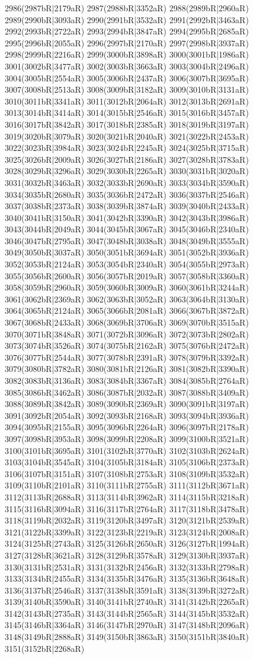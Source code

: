 2986(2987bR|2179aR) 2987(2988bR|3352aR) 2988(2989bR|2960aR) 2989(2990bR|3093aR) 2990(2991bR|3532aR) 2991(2992bR|3463aR) 2992(2993bR|2722aR) 2993(2994bR|3847aR) 2994(2995bR|2685aR) 2995(2996bR|2055aR) 2996(2997bR|2170aR) 2997(2998bR|3937aR) 2998(2999bR|2216aR) 2999(3000bR|3898aR) 3000(3001bR|1986aR) 3001(3002bR|3477aR) 3002(3003bR|3663aR) 3003(3004bR|2496aR) 3004(3005bR|2554aR) 3005(3006bR|2437aR) 3006(3007bR|3695aR) 3007(3008bR|2513aR) 3008(3009bR|3182aR) 3009(3010bR|3131aR) 3010(3011bR|3341aR) 3011(3012bR|2064aR) 3012(3013bR|2691aR) 3013(3014bR|3414aR) 3014(3015bR|2546aR) 3015(3016bR|3457aR) 3016(3017bR|3842aR) 3017(3018bR|2385aR) 3018(3019bR|3197aR) 3019(3020bR|3079aR) 3020(3021bR|2040aR) 3021(3022bR|2453aR) 3022(3023bR|3984aR) 3023(3024bR|2245aR) 3024(3025bR|3715aR) 3025(3026bR|2009aR) 3026(3027bR|2186aR) 3027(3028bR|3783aR) 3028(3029bR|3296aR) 3029(3030bR|2265aR) 3030(3031bR|3020aR) 3031(3032bR|3463aR) 3032(3033bR|2690aR) 3033(3034bR|3590aR) 3034(3035bR|2680aR) 3035(3036bR|2472aR) 3036(3037bR|2546aR) 3037(3038bR|2373aR) 3038(3039bR|3874aR) 3039(3040bR|2433aR) 3040(3041bR|3150aR) 3041(3042bR|3390aR) 3042(3043bR|3986aR) 3043(3044bR|2049aR) 3044(3045bR|3067aR) 3045(3046bR|2340aR) 3046(3047bR|2795aR) 3047(3048bR|3038aR) 3048(3049bR|3555aR) 3049(3050bR|3037aR) 3050(3051bR|3694aR) 3051(3052bR|3936aR) 3052(3053bR|2124aR) 3053(3054bR|2340aR) 3054(3055bR|2973aR) 3055(3056bR|2600aR) 3056(3057bR|2019aR) 3057(3058bR|3360aR) 3058(3059bR|2960aR) 3059(3060bR|3009aR) 3060(3061bR|3244aR) 3061(3062bR|2369aR) 3062(3063bR|3052aR) 3063(3064bR|3130aR) 3064(3065bR|2124aR) 3065(3066bR|2081aR) 3066(3067bR|3872aR) 3067(3068bR|2433aR) 3068(3069bR|3706aR) 3069(3070bR|3515aR) 3070(3071bR|3848aR) 3071(3072bR|3096aR) 3072(3073bR|2802aR) 3073(3074bR|3526aR) 3074(3075bR|2162aR) 3075(3076bR|2472aR) 3076(3077bR|2544aR) 3077(3078bR|2391aR) 3078(3079bR|3392aR) 3079(3080bR|3782aR) 3080(3081bR|2126aR) 3081(3082bR|3390aR) 3082(3083bR|3136aR) 3083(3084bR|3367aR) 3084(3085bR|2764aR) 3085(3086bR|3462aR) 3086(3087bR|2032aR) 3087(3088bR|3409aR) 3088(3089bR|3842aR) 3089(3090bR|2369aR) 3090(3091bR|3197aR) 3091(3092bR|2054aR) 3092(3093bR|2168aR) 3093(3094bR|3936aR) 3094(3095bR|2155aR) 3095(3096bR|2264aR) 3096(3097bR|2178aR) 3097(3098bR|3953aR) 3098(3099bR|2208aR) 3099(3100bR|3521aR) 3100(3101bR|3695aR) 3101(3102bR|3770aR) 3102(3103bR|2624aR) 3103(3104bR|3545aR) 3104(3105bR|3184aR) 3105(3106bR|2373aR) 3106(3107bR|3151aR) 3107(3108bR|2753aR) 3108(3109bR|3532aR) 3109(3110bR|2101aR) 3110(3111bR|2755aR) 3111(3112bR|3671aR) 3112(3113bR|2688aR) 3113(3114bR|3962aR) 3114(3115bR|3218aR) 3115(3116bR|3094aR) 3116(3117bR|2764aR) 3117(3118bR|3478aR) 3118(3119bR|2032aR) 3119(3120bR|3497aR) 3120(3121bR|2539aR) 3121(3122bR|3399aR) 3122(3123bR|2219aR) 3123(3124bR|2008aR) 3124(3125bR|2743aR) 3125(3126bR|2650aR) 3126(3127bR|1994aR) 3127(3128bR|3621aR) 3128(3129bR|3578aR) 3129(3130bR|3937aR) 3130(3131bR|2531aR) 3131(3132bR|2456aR) 3132(3133bR|2798aR) 3133(3134bR|2455aR) 3134(3135bR|3476aR) 3135(3136bR|3648aR) 3136(3137bR|2546aR) 3137(3138bR|3591aR) 3138(3139bR|3272aR) 3139(3140bR|3590aR) 3140(3141bR|2740aR) 3141(3142bR|2265aR) 3142(3143bR|2735aR) 3143(3144bR|2565aR) 3144(3145bR|3532aR) 3145(3146bR|3364aR) 3146(3147bR|2970aR) 3147(3148bR|2096aR) 3148(3149bR|2888aR) 3149(3150bR|3863aR) 3150(3151bR|3840aR) 3151(3152bR|2268aR) 